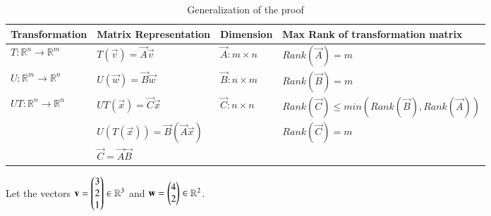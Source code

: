 \begin{table*}[h!]
\begin{center}
\begin{tabular}{|l|l|l|l|}
\hline
\textbf{Transformation}&\textbf{Matrix Representation}&\textbf{Dimension}&\textbf{Max Rank  of transformation matrix}\\[0.5ex]
\hline
$T:\mathbb{R}^n\rightarrow\mathbb{R}^m$ & $T(\vec{v})=\vec{A}\vec{v}$ & $\vec{A}:m\times n$ & $Rank(\vec{A})=m$\\[0.5ex]
\hline
$U:\mathbb{R}^m\rightarrow\mathbb{R}^n$ & $U(\vec{w})=\vec{B}\vec{w}$ & $\vec{B}:n\times m$ & $Rank(\vec{B})=m$\\[0.5ex]
\hline
$UT:\mathbb{R}^n\rightarrow\mathbb{R}^n$ & $UT(\vec{x})=\vec{C}\vec{x}$ & $\vec{C}:n\times n$ & $Rank(\vec{C})\le min(Rank(\vec{B}),Rank(\vec{A}))$\\[0.5ex]
&$U(T(\vec{x}))=\vec{B}(\vec{A}\vec{x})$&&$Rank(\vec{C})=m$\\[0.5ex]
&$\vec{C}=\vec{A}\vec{B}$&&\\[0.5ex]
\hline
\end{tabular}
\caption{Generalization of the proof }
\label{eq:solutions/3/2/6/tab:general}
\end{center}
\vspace{-0.5cm}
\end{table*}
Let the vectors $\mathbf{v}=\begin{pmatrix}3\\2\\1\end{pmatrix} \in \mathbb{R}^3$ and $\mathbf{w}=\begin{pmatrix}4\\2\end{pmatrix} \in \mathbb{R}^2$.
